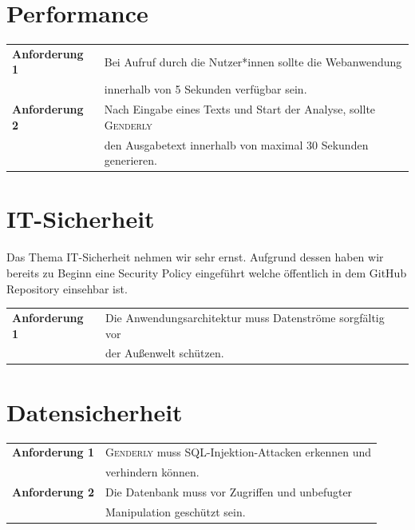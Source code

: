\documentclass[paper=a4, parskip=half]{scrreprt}
\newcommand{\Genderly}{\textsc{Genderly}}
\begin{document}
\section{Performance}
\begin{table}[!htb]
\begin{tabular}{ll}
\textbf{Anforderung 1} & Bei Aufruf durch die Nutzer*innen sollte die Webanwendung \\
& innerhalb von 5 Sekunden verfügbar sein. \vspace{0.15cm}\\ 
\textbf{Anforderung 2} & Nach Eingabe eines Texts und Start der Analyse, sollte \Genderly{} \\
& den Ausgabetext innerhalb von maximal 30 Sekunden generieren. \vspace{0.15cm}\\ 
\end{tabular}
\end{table}

\section{IT-Sicherheit}
Das Thema IT-Sicherheit nehmen wir sehr ernst. Aufgrund dessen haben wir bereits zu Beginn eine Security Policy eingeführt welche öffentlich in dem GitHub Repository einsehbar ist. 
\begin{table}[!htb]
\begin{tabular}{ll}
\textbf{Anforderung 1} & Die Anwendungsarchitektur muss Datenströme sorgfältig vor \\
& der Außenwelt schützen. \vspace{0.15cm}\\ 
\end{tabular}
\end{table}

\section{Datensicherheit}
\begin{table}[!htb]
\begin{tabular}{ll}
\textbf{Anforderung 1} & \Genderly{} muss SQL-Injektion-Attacken erkennen und \\
& verhindern können. \vspace{0.15cm}\\ 
\textbf{Anforderung 2} & Die Datenbank muss vor Zugriffen und unbefugter \\
& Manipulation geschützt sein. \vspace{0.15cm}\\ 
\end{tabular}
\end{table}
\end{document}
